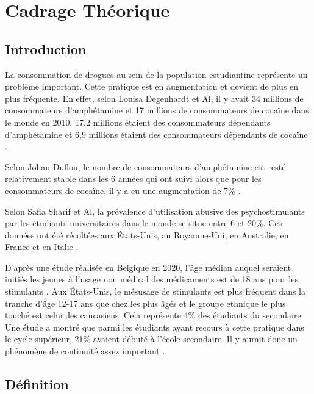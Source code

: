 \chapter{Cadrage Théorique}
\section{Introduction}

La consommation de drogues au sein de la population estudiantine représente un problème important.  Cette pratique est en augmentation et devient de plus en plus fréquente. En effet, selon Louisa Degenhardt et Al, il y avait 34 millions de consommateurs d'amphétamine et 17 millions de consommateurs de cocaïne dans le monde en 2010. 17,2 millions étaient des consommateurs dépendants d'amphétamine et 6,9 millions étaient des consommateurs dépendants de cocaïne \parencite{degenhardt_global_2014}. \newline


Selon Johan Duflou, le nombre de consommateurs d'amphétamine est resté relativement stable dans les 6 années qui ont suivi alors que pour les consommateurs de cocaïne, il y a eu une augmentation de 7\% \parencite{duflou_psychostimulant_2020}. \newline

Selon Safia Sharif et Al, la prévalence d'utilisation abusive des psychostimulants par les étudiants universitaires dans le monde se situe entre 6 et 20\%. Ces données ont été récoltées aux États-Unis, au Royaume-Uni, en Australie, en France et en Italie \parencite{sharif_use_2021}. \newline

D'après une étude réalisée en Belgique en 2020, l'âge médian auquel seraient initiés les jeunes  à l'usage non médical des médicaments est de 18 ans pour les stimulants \parencite{c_guillain_les_2021}. 
Aux États-Unis, le mésusage de stimulants est plus fréquent dans la tranche d'âge 12-17 ans que chez les plus âgés et le groupe ethnique le plus touché est celui des caucasiens. Cela représente 4\% des étudiants du secondaire. Une étude a montré que parmi les étudiants ayant recours à cette pratique dans le cycle supérieur, 21\% avaient débuté à l'école secondaire. Il y aurait donc un phénomène de continuité assez important \parencite{levy_usages_2008-1}.




\section{Définition}

